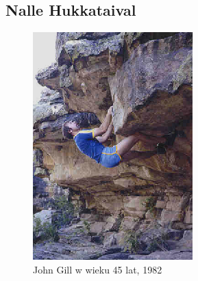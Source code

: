 \documentclass{article}
\begin{document}
\subsection{Nalle Hukkataival}
\label{nh}

\begin{figure}[!htbp]
	\begin{center}
		\includegraphics[width=0.5\linewidth]{images/gill-2.eps}
	\end{center}
	\caption{John Gill w wieku 45 lat, 1982 \cite{gill-website}}
	\label{gill-1}
\end{figure}

\nocite{*}
\printbibliography
\end{document}
